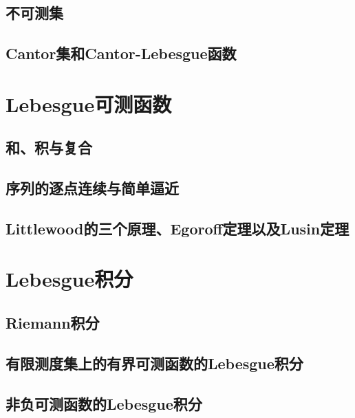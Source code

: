 \documentclass[lang=cn,newtx,10pt,scheme=chinese]{../Template/elegantbook}
\begin{document}
\section{不可测集}





\section{Cantor集和Cantor-Lebesgue函数}







\chapter{Lebesgue可测函数}

\section{和、积与复合}

\section{序列的逐点连续与简单逼近}

\section{Littlewood的三个原理、Egoroff定理以及Lusin定理}









\chapter{Lebesgue积分}

\section{Riemann积分}

\section{有限测度集上的有界可测函数的Lebesgue积分}

\section{非负可测函数的Lebesgue积分}
\end{document}
